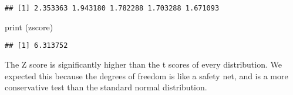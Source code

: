 \documentclass[
]{article}
\newenvironment{Shaded}{\begin{snugshade}}{\end{snugshade}}
\newcommand{\FunctionTok}[1]{\textcolor[rgb]{0.00,0.00,0.00}{#1}}
\newcommand{\NormalTok}[1]{#1}
\begin{document}
\begin{verbatim}
## [1] 2.353363 1.943180 1.782288 1.703288 1.671093
\end{verbatim}

\begin{Shaded}
\begin{Highlighting}[]
\FunctionTok{print}\NormalTok{ (zscore)}
\end{Highlighting}
\end{Shaded}

\begin{verbatim}
## [1] 6.313752
\end{verbatim}

The Z score is significantly higher than the t scores of every
distribution. We expected this because the degrees of freedom is like a
safety net, and is a more conservative test than the standard normal
distribution.
\end{document}
